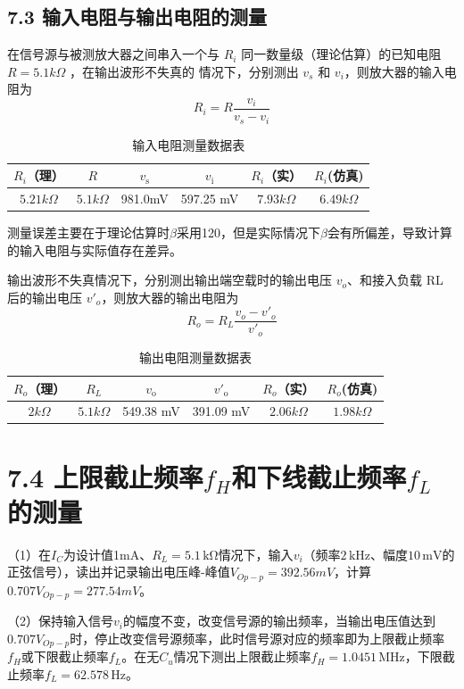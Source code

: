 \documentclass[12pt,a4paper]{article}
\begin{document}
\subsection*{7.3 输入电阻与输出电阻的测量}
在信号源与被测放大器之间串入一个与 $R_i$ 同一数量级（理论估算）的已知电阻 $R=5.1k \Omega$ ，在输出波形不失真的
情况下，分别测出 $v_s$ 和 $v_i$，则放大器的输入电阻为
\[R_i = R \frac{v_i}{v_s - v_i}\]
 \begin{table}[H]
\centering
\begin{tabular}{|c|c|c|c|c|c|}
\hline
$R_i$（理） & $R$ & $v_{\text{s}}$ & $v_{\text{i}}$ & $R_i$（实）&$R_i$(仿真) \\
\hline
 $5.21k \Omega$& $5.1 k \Omega$ & 981.0mV & 597.25 mV &  $7.93 k \Omega$ & $6.49k \Omega$\\
\hline
\end{tabular}
\caption{输入电阻测量数据表}
\end{table}
测量误差主要在于理论估算时$\beta$采用120，但是实际情况下$\beta$会有所偏差，导致计算的输入电阻与实际值存在差异。

输出波形不失真情况下，分别测出输出端空载时的输出电压 $v_o$、和接入负载 RL 后的输出电压 $v'_o$，则放大器的输出电阻为
\[R_o = R_L \frac{v_o - v'_o}{v'_o}\]
 \begin{table}[H]
\centering
\begin{tabular}{|c|c|c|c|c|c|}
\hline
$R_o$（理） & $R_L$ & $v_{\text{o}}$ & $v'_{\text{o}}$ & $R_o$（实）&$R_o$(仿真) \\
\hline
 $2k \Omega$& $5.1 k \Omega$ & 549.38 mV & 391.09 mV &  $2.06 k \Omega$ & $1.98k \Omega$\\
\hline
\end{tabular}
\caption{输出电阻测量数据表}
\end{table}
\section*{7.4 上限截止频率$f_H$和下线截止频率$f_L$的测量}
（1）在$I_C$为设计值1mA、$R_L=5.1\,\text{kΩ}$情况下，输入$v_i$（频率$2\,\text{kHz}$、幅度$10\,\text{mV}$的正弦信号），读出并记录输出电压峰-峰值$V_{Op-p}=392.56 mV$，计算$0.707V_{Op-p}=277.54 mV$。

（2）保持输入信号$v_i$的幅度不变，改变信号源的输出频率，当输出电压值达到$0.707V_{Op-p}$时，停止改变信号源频率，此时信号源对应的频率即为上限截止频率$f_H$或下限截止频率$f_L$。在无$C_u$情况下测出上限截止频率$f_H=1.0451\,\text{MHz}$，下限截止频率$f_L=62.578\,\text{Hz}$。
\end{document}
